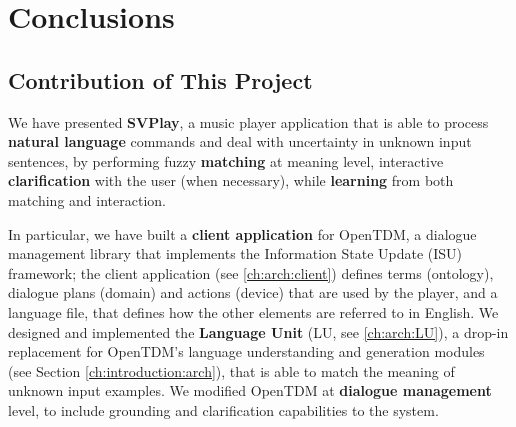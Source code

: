 
\chapter{Conclusions} %

\label{ch:conclusions} %


\section{Contribution of This Project}
We have presented \textbf{SVPlay}, a music player application that is able to process \textbf{natural language} commands and deal with uncertainty in unknown input sentences, by performing fuzzy \textbf{matching} at meaning level, interactive \textbf{clarification} with the user (when necessary), while \textbf{learning} from both matching and interaction.

In particular, we have built a \textbf{client application} for OpenTDM, a dialogue management library that implements the Information State Update (ISU) framework; the client application (see \ref{ch:arch:client}) defines terms (ontology), dialogue plans (domain) and actions (device) that are used by the player, and a language file, that defines how the other elements are referred to in English. We designed and implemented the \textbf{Language Unit} (LU, see \ref{ch:arch:LU}), a drop-in replacement for OpenTDM's language understanding and generation modules (see Section \ref{ch:introduction:arch}), that is able to match the meaning of unknown input examples. We modified OpenTDM at \textbf{dialogue management} level, to include grounding and clarification capabilities to the system.


